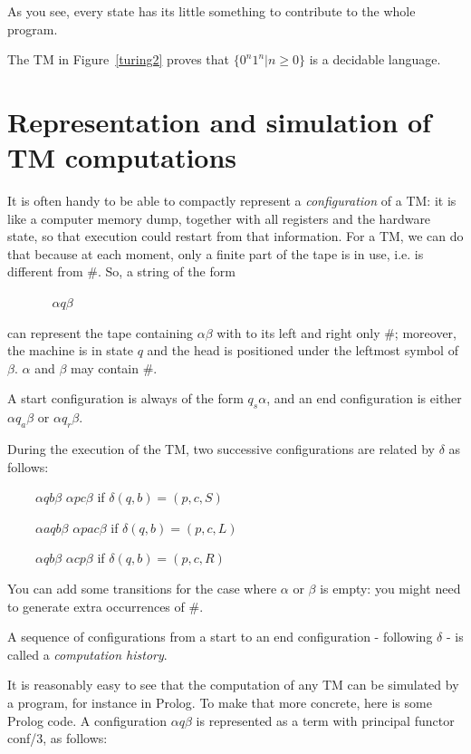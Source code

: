 As you see, every state has its little something to contribute to the
whole program.


The TM in Figure~\ref{turing2} proves that
%
$\{0^n1^n|n \geq 0\}$ is a decidable language.

\section{Representation and simulation of TM computations}

It is often handy to be able to compactly represent a {\em
  configuration} of a TM: it is like a computer memory dump, together
with all registers and the hardware state, so that execution could
restart from that information. For a TM, we can do that because at
each moment, only a finite part of the tape is in use, i.e. is
different from \#. So, a string of the form

$~~~~~~~~~~~~~~~~\alpha q \beta$

can represent the tape containing $\alpha\beta$ with to its left and
right only \#; moreover, the machine is in state $q$ and the head is
positioned under the leftmost symbol of $\beta$. $\alpha$ and $\beta$
may contain \#.

A start configuration is always of the form $q_s\alpha$, and an end
configuration is either $\alpha q_a \beta$ or $\alpha q_r \beta$.

During the execution of the TM, two successive configurations are
related by $\delta$ as follows:


$~~~~~~~~~~\alpha q b \beta$ \rpijl $\alpha p c \beta$ if $\delta(q,b) = (p,c,S)$

$~~~~~~~~~~\alpha a q b \beta$ \rpijl $\alpha p a c \beta$ if $\delta(q,b) = (p,c,L)$

$~~~~~~~~~~\alpha q b \beta$ \rpijl $\alpha c p \beta$ if $\delta(q,b) = (p,c,R)$

You can add some transitions for the case where $\alpha$ or $\beta$ is
empty: you might need to generate extra occurrences of \#.


A sequence of configurations from a start to an end configuration -
following $\delta$ - is called a {\em computation history}.

It is reasonably easy to see that the computation of any TM can be
simulated by a program, for instance in Prolog. To make that more
concrete, here is some Prolog code. A configuration $\alpha q \beta$
is represented as a term with principal functor conf/3, as follows:

